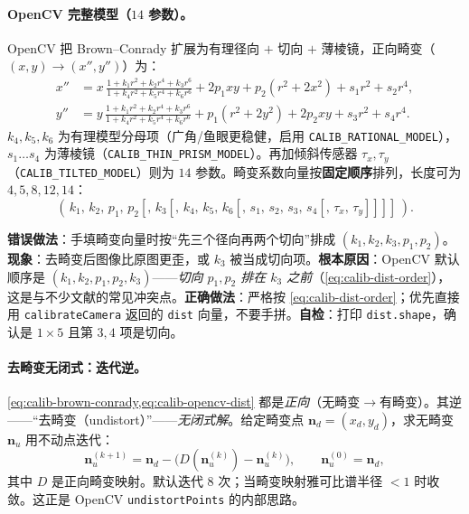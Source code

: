 \paragraph{OpenCV 完整模型（$14$ 参数）。}
OpenCV 把 Brown--Conrady 扩展为有理径向 $+$ 切向 $+$ 薄棱镜，正向畸变（$(x,y)\to(x'',y'')$）为\cite{opencv2024calib}：
\begin{equation}
  \begin{aligned}
  x'' &= x\,\frac{1+k_1r^2+k_2r^4+k_3r^6}{1+k_4r^2+k_5r^4+k_6r^6}+2p_1xy+p_2(r^2+2x^2)+s_1r^2+s_2r^4,\\
  y'' &= y\,\frac{1+k_1r^2+k_2r^4+k_3r^6}{1+k_4r^2+k_5r^4+k_6r^6}+p_1(r^2+2y^2)+2p_2xy+s_3r^2+s_4r^4.
  \end{aligned}
  \label{eq:calib-opencv-dist}
\end{equation}
$k_4,k_5,k_6$ 为有理模型分母项（广角/鱼眼更稳健，启用 \texttt{CALIB\_RATIONAL\_MODEL}），$s_1\ldots s_4$ 为薄棱镜（\texttt{CALIB\_THIN\_PRISM\_MODEL}）。再加倾斜传感器 $\tau_x,\tau_y$（\texttt{CALIB\_TILTED\_MODEL}）则为 $14$ 参数。畸变系数向量按\textbf{固定顺序}排列，长度可为 $4,5,8,12,14$：
\begin{equation}
  (\,k_1,\,k_2,\,p_1,\,p_2[,\,k_3[,\,k_4,\,k_5,\,k_6[,\,s_1,\,s_2,\,s_3,\,s_4[,\,\tau_x,\,\tau_y]]]]\,).
  \label{eq:calib-dist-order}
\end{equation}

\begin{pitfall}
\textbf{错误做法}：手填畸变向量时按“先三个径向再两个切向”排成 $(k_1,k_2,k_3,p_1,p_2)$。\textbf{现象}：去畸变后图像比原图更歪，或 $k_3$ 被当成切向项。\textbf{根本原因}：OpenCV 默认顺序是 $(k_1,k_2,p_1,p_2,k_3)$——\emph{切向 $p_1,p_2$ 排在 $k_3$ 之前}（\cref{eq:calib-dist-order}），这是与不少文献的常见冲突点。\textbf{正确做法}：严格按 \cref{eq:calib-dist-order}；优先直接用 \texttt{calibrateCamera} 返回的 \texttt{dist} 向量，不要手拼。\textbf{自检}：打印 \texttt{dist.shape}，确认是 $1\times5$ 且第 $3,4$ 项是切向。
\end{pitfall}

\paragraph{去畸变无闭式：迭代逆。}
\cref{eq:calib-brown-conrady,eq:calib-opencv-dist} 都是\emph{正向}（无畸变$\to$有畸变）。其逆——“去畸变（undistort）”——\emph{无闭式解}。给定畸变点 $\mathbf{n}_d=(x_d,y_d)$，求无畸变 $\mathbf{n}_u$ 用不动点迭代\cite{vorobyev2023distortion}：
\begin{equation}
  \mathbf{n}_u^{(k+1)}=\mathbf{n}_d-\big(D(\mathbf{n}_u^{(k)})-\mathbf{n}_u^{(k)}\big),\qquad \mathbf{n}_u^{(0)}=\mathbf{n}_d,
  \label{eq:calib-undistort-iter}
\end{equation}
其中 $D$ 是正向畸变映射。默认迭代 $8$ 次；当畸变映射雅可比谱半径 $<1$ 时收敛。这正是 OpenCV \texttt{undistortPoints} 的内部思路。


